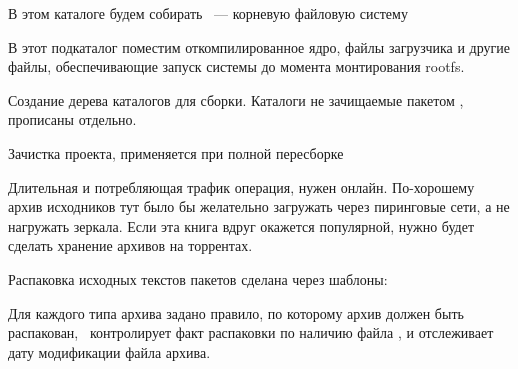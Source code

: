 
В этом каталоге будем собирать \ --- корневую файловую систему




В этот подкаталог поместим откомпилированное ядро, файлы загрузчика и другие
файлы, обеспечивающие запуск системы до момента монтирования rootfs.



\secup





Создание дерева каталогов для сборки.
Каталоги не зачищаемые пакетом , прописаны отдельно. 




Зачистка проекта, применяется при полной пересборке




Длительная и потребляющая трафик операция, нужен онлайн.
По-хорошему архив исходников тут было бы желательно загружать через пиринговые
сети, а не нагружать зеркала. Если эта книга вдруг окажется популярной, нужно
будет сделать хранение архивов на торрентах.




Распаковка исходных текстов пакетов сделана через шаблоны:



Для каждого типа архива задано правило, по которому архив должен быть
распакован, \ контролирует факт распаковки по наличию файла
, и отслеживает дату модификации файла архива.


